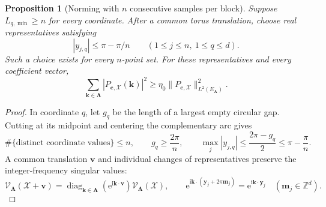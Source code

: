 \documentclass[11pt]{article}
\newtheorem{proposition}{Proposition}
\newcommand{\V}{\mathcal V}
\newcommand{\X}{\mathcal X}
\newcommand{\Z}{\mathbb Z}
\newcommand{\ii}{\mathrm i}
\begin{document}
\begin{proposition}[Norming with $n$ consecutive samples per block]\label{prop:norming}
Suppose $L_{q,\min}\ge n$ for every coordinate. After a common torus translation, choose real representatives satisfying
\begin{equation}\label{eq:chart}
|y_{j,q}|\le\pi-\pi/n\qquad(1\le j\le n,\ 1\le q\le d).
\end{equation}
Such a choice exists for every $n$-point set. For these representatives and every coefficient vector,
\begin{equation}\label{eq:norming}
\sum_{\bm k\in\bm\Lambda}|P_{\bm c,\X}(\bm k)|^2\ge\eta_0\|P_{\bm c,\X}\|_{L^2(E_{\bm\Lambda})}^2.
\end{equation}
\end{proposition}
\begin{proof}
In coordinate $q$, let $g_q$ be the length of a largest empty circular gap. Cutting at its midpoint and centering the complementary arc gives
\[
\#\{\text{distinct coordinate values}\}\le n,\qquad g_q\ge\frac{2\pi}{n},\qquad \max_j|y_{j,q}|\le\frac{2\pi-g_q}{2}\le\pi-\frac\pi n.
\]
A common translation $\bm v$ and individual changes of representatives preserve the integer-frequency singular values:
\[
\V_{\bm\Lambda}(\X+\bm v)=\operatorname{diag}_{\bm k\in\bm\Lambda}(\mathrm e^{\ii\bm k\cdot\bm v})\V_{\bm\Lambda}(\X),\qquad \mathrm e^{\ii\bm k\cdot(\bm y_j+2\pi\bm m_j)}=\mathrm e^{\ii\bm k\cdot\bm y_j}\quad(\bm m_j\in\Z^d).
\]


\end{proof}
\end{document}
